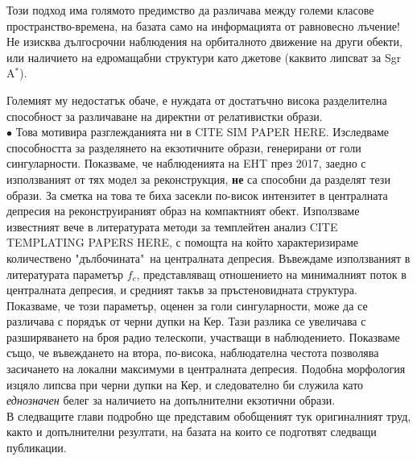 Този подход има голямото предимство да различава между големи класове пространство-времена, на базата само на информацията от равновесно лъчение! Не изисква дългосрочни наблюдения на орбиталното движение на други обекти, или наличието на едромащабни структури като джетове (каквито липсват за Sgr A$^*$).
\newpage

Големият му недостатък обаче, е нуждата от достатъчно висока разделителна способност за различаване на директни от релативистки образи. \\\newline
$\bullet$ Това мотивира разглежданията ни в CITE SIM PAPER HERE. Изследваме способността за разделянето на екзотичните образи, генерирани от голи сингуларности. Показваме, че наблюденията на EHT през 2017, заедно с използваният от тях модел за реконструкция, \textbf{не} са способни да разделят тези образи. За сметка на това те биха засекли по-висок интензитет в централната депресия на реконструираният образ на компактният обект. Използваме известният вече в литературата методи за темплейтен анализ CITE TEMPLATING PAPERS HERE, с помощта на който характеризираме количествено "дълбочината"$\,$ на централната депресия. Въвеждаме използваният в литературата параметър $f_c$, представляващ отношението на минималният поток в централната депресия, и средният такъв за пръстеновидната структура. Показваме, че този параметър, оценен за голи сингуларности, може да се различава с порядък от черни дупки на Кер. Тази разлика се увеличава с разширяването на броя радио телескопи, участващи в наблюдението. Показваме също, че въвеждането на втора, по-висока, наблюдателна честота позволява засичането на локални максимуми в централната депресия. Подобна морфология изцяло липсва при черни дупки на Кер, и следователно би служила като \emph{еднозначен} белег за наличието на допълнителни екзотични образи.\\\newline
В следващите глави подробно ще представим обобщеният тук оригиналният труд, както и допълнителни резултати, на базата на които се подготвят следващи публикации. 
\lfoot{}